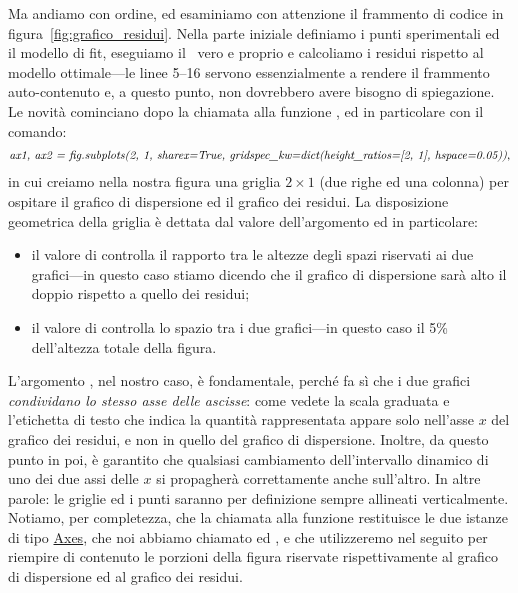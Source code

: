 Ma andiamo con ordine, ed esaminiamo con attenzione il frammento di codice in
figura~\ref{fig:grafico_residui}. Nella parte iniziale definiamo i punti sperimentali
ed il modello di fit, eseguiamo il \fit\ vero e proprio e calcoliamo i residui
rispetto al modello ottimale---le linee 5--16 servono essenzialmente a rendere
il frammento auto-contenuto e, a questo punto, non dovrebbero avere bisogno di
spiegazione.
Le novità cominciano dopo la chiamata alla funzione , ed in
particolare con il comando:
\begin{align*}
  \text{\emph{ax1, ax2 = fig.subplots(2, 1, sharex=True,
    gridspec\_kw=dict(height\_ratios=[2, 1], hspace=0.05))},}
\end{align*}
in cui creiamo nella nostra figura una griglia $2 \times 1$ (due righe ed una colonna)
per ospitare il grafico di dispersione ed il grafico dei residui.
La disposizione geometrica della griglia è dettata dal valore dell'argomento
 ed in particolare:
\begin{itemize}
  \item il valore di  controlla il rapporto tra le altezze
    degli spazi riservati ai due grafici---in questo caso stiamo dicendo che
    il grafico di dispersione sarà alto il doppio rispetto a quello dei
    residui;
  \item il valore di  controlla lo spazio tra i due grafici---in
    questo caso il 5\% dell'altezza totale della figura.
\end{itemize}
L'argomento , nel nostro caso, è fondamentale, perché fa sì che
i due grafici \emph{condividano lo stesso asse delle ascisse}: come vedete la scala
graduata e l'etichetta di testo che indica la quantità rappresentata appare solo
nell'asse $x$ del grafico dei residui, e non in quello del grafico di dispersione.
Inoltre, da questo punto in poi, è garantito che qualsiasi cambiamento dell'intervallo
dinamico di uno dei due assi delle $x$ si propagherà correttamente anche sull'altro.
In altre parole: le griglie ed i punti saranno per definizione sempre allineati
verticalmente. Notiamo, per completezza, che la chiamata alla funzione 
restituisce le due istanze di tipo \href{https://matplotlib.org/stable/api/axes_api.html}{Axes},
che noi abbiamo chiamato  ed , e che utilizzeremo nel seguito
per riempire di contenuto le porzioni della figura riservate rispettivamente al
grafico di dispersione ed al grafico dei residui.

